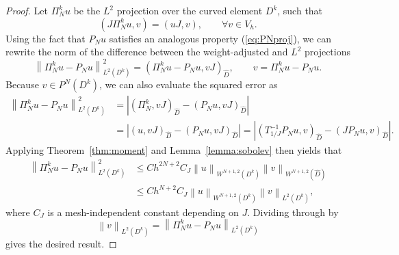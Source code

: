 \documentclass[preprint,10pt]{article}
\theoremstyle{definition}
\theoremstyle{lemma}
\theoremstyle{theorem}
\theoremstyle{assumption}
\renewcommand{\hat}{\widehat}
\newcommand{\nor}[1]{\left\| #1 \right\|}
\newcommand{\LRp}[1]{\left( #1 \right)}
\newcommand{\LRb}[1]{\left| #1 \right|}
\begin{document}
{\begin{proof}
Let $\Pi_N^k u$ be the $L^2$ projection over the curved element $D^k$, such that
\[
\LRp{J\Pi_N^k u,v} = \LRp{u J,v}, \qquad \forall v\in V_h.
\]
Using the fact that $P_N u$ satisfies an analogous property (\ref{eq:PNproj}),  we can rewrite the norm of the difference between the weight-adjusted and $L^2$ projections
\[
\nor{\Pi_N^k  u - P_N u}_{L^2\LRp{D^k}}^2 = \LRp{\Pi_N^k  u - P_N u,vJ}_{\hat{D}}, \qquad v = \Pi_N^k  u - P_N u.
\]
Because $v \in P^N\LRp{D^k}$, we can also evaluate the squared error as
\begin{align*}
\nor{\Pi_N^k  u - P_N u}_{L^2\LRp{D^k}}^2 &= \LRb{\LRp{\Pi_N^k ,vJ}_{\hat{D}} - \LRp{P_N u,vJ}_{\hat{D}}}\\
& = \LRb{\LRp{u,vJ}_{\hat{D}} - \LRp{P_N u,vJ}_{\hat{D}}} = \LRb{\LRp{T_{1/J}^{-1}P_N u,v}_{\hat{D}} - \LRp{JP_N u,v}_{\hat{D}}}.
\end{align*}
Applying Theorem~\ref{thm:moment} and Lemma~\ref{lemma:sobolev} then yields that 
\begin{align*}
\nor{\Pi_N^k u - P_N u}_{L^2\LRp{D^k}}^2 &\leq Ch^{2N+2} C_J\nor{u}_{W^{N+1,2}\LRp{D^k}}
\nor{v}_{W^{N+1,2}\LRp{\hat{D}}} \\
&\leq Ch^{N+2} C_J\nor{u}_{W^{N+1,2}\LRp{D^k}}\nor{v}_{L^2\LRp{D^k}},
\end{align*}
where $C_J$ is a mesh-independent constant depending on $J$.  Dividing through by 
\[
\nor{v}_{L^2\LRp{D^k}} = \nor{\Pi^k_N u - P_N u}_{L^2\LRp{D^k}}
\]
 gives the desired result.  %
\end{proof}

}
\end{document}
